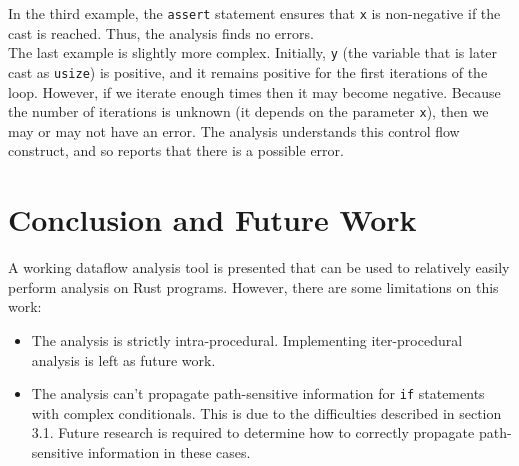 \documentclass[11pt,a4paper]{article}
\begin{document}
In the third example, the \texttt{assert} statement ensures that \texttt{x} is non-negative
if the cast is reached. Thus, the analysis finds no errors.\\

The last example is slightly more complex. Initially, \texttt{y} (the variable that is later cast as \texttt{usize})
is positive, and it remains positive for the first iterations of the loop. However, if we iterate enough times
then it may become negative. Because the number of iterations is unknown (it depends on the parameter \texttt{x}),
then we may or may not have an error. The analysis understands this control flow construct, and so reports
that there is a possible error.


\section{Conclusion and Future Work}

A working dataflow analysis tool is presented that can be used to relatively
easily perform analysis on Rust programs. However, there are some limitations 
on this work:

\begin{itemize}
    \item The analysis is strictly intra-procedural. Implementing iter-procedural analysis
    is left as future work.
    \item The analysis can't propagate path-sensitive information for \texttt{if} statements
    with complex conditionals. This is due to the difficulties described in section 3.1.
    Future research is required to determine how to correctly propagate path-sensitive information
    in these cases.
\end{itemize}



\end{document}
